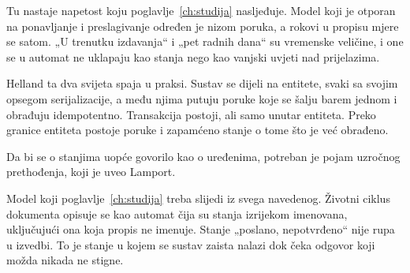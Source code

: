 Tu nastaje napetost koju poglavlje~\ref{ch:studija} nasljeđuje. Model koji
je otporan na ponavljanje i preslagivanje određen je nizom poruka, a rokovi
u propisu mjere se satom. „U trenutku izdavanja“ i „pet radnih dana“ su
vremenske veličine, i one se u automat ne uklapaju kao stanja nego kao
vanjski uvjeti nad prijelazima.

Helland ta dva svijeta spaja u
praksi\cite{helland2007lifebeyond}. Sustav se dijeli na entitete, svaki sa
svojim opsegom serijalizacije, a među njima putuju poruke koje se šalju
barem jednom i obrađuju idempotentno. Transakcija postoji, ali samo unutar
entiteta. Preko granice entiteta postoje poruke i zapamćeno stanje o tome
što je već obrađeno.

Da bi se o stanjima uopće govorilo kao o uređenima, potreban je pojam
uzročnog prethođenja, koji je uveo Lamport\cite{lamport1978time}.

Model koji poglavlje~\ref{ch:studija} treba slijedi iz svega navedenog.
Životni ciklus dokumenta opisuje se kao automat čija su stanja izrijekom
imenovana, uključujući ona koja propis ne imenuje. Stanje
„poslano, nepotvrđeno“ nije rupa u izvedbi. To je stanje u kojem se sustav
zaista nalazi dok čeka odgovor koji možda nikada ne stigne.
